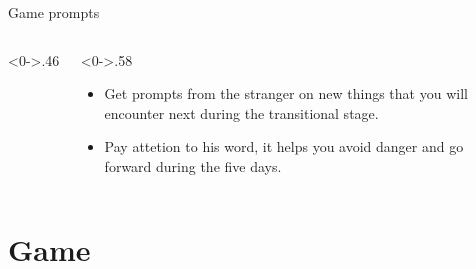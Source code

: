 \documentclass[notheorems]{beamer}
\begin{document}
\begin{framenl}{Game prompts}
\begin{columns}[T]
\begin{column}<0->{.46\textwidth}
	\begin{figure}[thpb]
		\centering
		
	\end{figure}
\end{column}%
\hfill%
\begin{column}<0->{.58\textwidth}
	\begin{itemize}
		\item<1-> Get prompts from the stranger on new things that you will encounter next during the transitional stage.
		\item<2-> Pay attetion to his word, it helps you avoid danger and go forward during the five days.
	\end{itemize}
\end{column}%
\end{columns}
\end{framenl}

\section{Game}
\end{document}
